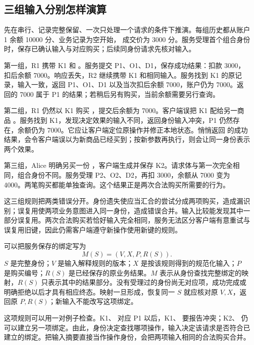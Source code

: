 \subsection*{三组输入分别怎样演算}

先在串行、记录完整保留、一次只处理一个请求的条件下推演。每组历史都从账户 1 余额 10000 分、业务记录为空开始， 成交价为 3000 分。服务受理首个组合身份时，保存已确认输入与对应购买；后续同身份请求先核对输入。

第一组，R1 携带 K1 和 。服务提交 P1、O1、D1，保存成功结果：扣款 3000，扣后余额 7000。响应丢失，R2 继续携带 K1 和相同输入。服务找到 K1 的原记录，输入一致，返回 P1、O1、D1 以及当次扣后余额 7000，账户仍为 7000。返回的 7000 属于 P1 的结果；若稍后另有购买，当前余额需要另行查询。

第二组，R1 仍然以 K1 购买 ，提交后余额为 7000。客户端误把 K1 配给另一商品 。服务找到 K1，发现决定效果的输入不同，返回身份输入冲突，P1 仍然存在，余额仍为 7000。它应让客户端定位原操作并修正本地状态。悄悄返回  的成功结果，会令客户端误以为新商品已经买到；按新参数再执行，则会让同一身份表示两个效果。

第三组，Alice 明确另买一份 ，客户端生成并保存 K2。请求体与第一次完全相同，组合身份不同。服务受理 P2、O2、D2，再扣 3000，余额从 7000 变为 4000。两笔购买都能单独查询。这个结果正是两次合法购买所需要的行为。



这三组规则把两类错误分开。身份遗失使应当汇合的尝试分成两项购买，造成漏识别；误复用使两项业务意图进入同一身份，造成错误合并。输入比较能发现其中一部分误复用。两次合法购买若恰好输入完全相同，服务无法区分客户端有意重试与误复用旧键，因此仍需客户端遵守新操作使用新键的规则。

可以把服务保存的绑定写为
\[
 M(S)=(V,X,P,R(S)).
\]
\(S\) 是完整身份；\(V\) 是输入解释规则的版本；\(X\) 是按该规则得到的规范化输入；\(P\) 是购买编号；\(R(S)\) 是已经保存的原业务结果。\(M\) 表示从身份查找完整绑定的映射，\(R(S)\) 只表示其中的结果部分。没有受理过的身份尚无对应项，成功完成或明确拒绝以后才具有相应终态。映射一旦形成，恢复同一 \(S\) 就应核对原 \(V,X\)，返回原 \(P,R(S)\)；新输入不能改写这项绑定。

这项规则可以用一对例子检查。K1、 对应 P1 以后，K1、 要报告冲突；K2、 仍可以建立另一项绑定。由此，身份决定查找哪项操作，输入决定该请求是否符合已建立的绑定。把输入摘要直接当作操作身份，会把两项输入相同的合法购买合并。

